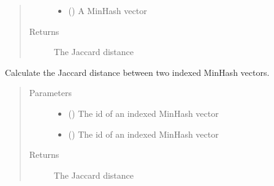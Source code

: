 \documentclass[letterpaper,10pt,english]{sphinxmanual}
\begin{document}
\begin{fulllineitems}
\begin{fulllineitems}
\begin{quote}
\begin{description}
\begin{itemize}
\item {} 
 () \textendash{} A MinHash vector

\end{itemize}

\item[{Returns}] \leavevmode
{} The Jaccard distance

\end{description}\end{quote}

\end{fulllineitems}


\begin{fulllineitems}
\label{\detokenize{documentation:tmap.LSHForest.get_distance_by_id}}
Calculate the Jaccard distance between two indexed MinHash vectors.
\begin{quote}\begin{description}
\item[{Parameters}] \leavevmode\begin{itemize}
\item {} 
 () \textendash{} The id of an indexed MinHash vector

\item {} 
 () \textendash{} The id of an indexed MinHash vector

\end{itemize}

\item[{Returns}] \leavevmode
{} The Jaccard distance

\end{description}\end{quote}

\end{fulllineitems}



\end{fulllineitems}
\end{document}
